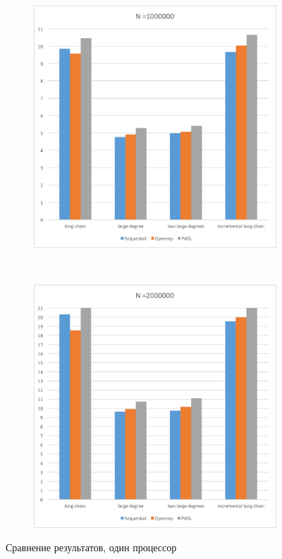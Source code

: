 \documentclass[specification,annotation]{itmo-student-thesis}
\begin{document}
\begin{figure}[!ht]
\begin{subfigure}[b]{0.45\textwidth}
\end{subfigure}\\
\begin{subfigure}[b]{0.45\textwidth}
    \includegraphics[width=\textwidth]{pic/results-1-c.png}
\end{subfigure}~~\begin{subfigure}[b]{0.45\textwidth}
    \includegraphics[width=\textwidth]{pic/results-1-d.png}
\end{subfigure}
\caption{Сравнение результатов, один процессор}\label{fig:results-comparison-1}
\end{figure}
\end{document}
